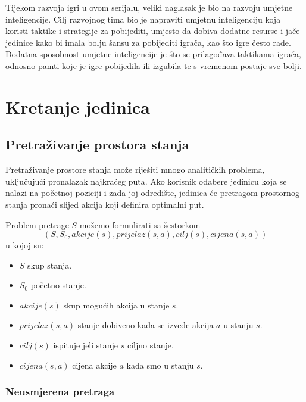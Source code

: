 \documentclass[times, utf8, zavrsni, numeric]{fer}
\begin{document}
\par Tijekom razvoja igri u ovom serijalu, veliki naglasak je bio na razvoju umjetne inteligencije.
Cilj razvojnog tima bio je napraviti umjetnu inteligenciju koja koristi taktike i strategije za pobijediti, umjesto da dobiva dodatne resurse i jače jedinice kako bi imala bolju šansu za pobijediti igrača, kao što igre često rade.
Dodatna sposobnost umjetne inteligencije je što se prilagođava taktikama igrača, odnosno pamti koje je igre pobijedila ili izgubila te s vremenom postaje sve bolji.

\chapter{Kretanje jedinica}\label{ch:pathfinding}

\section{Pretraživanje prostora stanja}\label{sec:stateSearch}

\par Pretraživanje prostore stanja može riješiti mnogo analitičkih problema, uključujući pronalazak najkraćeg puta. 
Ako korisnik odabere jedinicu koja se nalazi na početnoj poziciji i zada joj odredište, jedinica će pretragom prostornog stanja pronaći slijed akcija koji definira optimalni put.

\par Problem pretrage \(S\) možemo formulirati sa šestorkom
\[(S, S_0, akcije(s), prijelaz(s, a), cilj(s), cijena(s, a))\]
u kojoj su:
\begin{itemize}
    \item \(S\) skup stanja.
    \item \(S_0\) početno stanje.
    \item \(akcije(s)\) skup mogućih akcija u stanje \(s\).
    \item \(prijelaz(s, a)\) stanje dobiveno kada se izvede akcija \(a\) u stanju \(s\).
    \item \(cilj(s)\) ispituje jeli stanje \(s\) ciljno stanje.
    \item \(cijena(s, a)\) cijena akcije \(a\) kada smo u stanju \(s\). 
\end{itemize}

\subsection{Neusmjerena pretraga}
\end{document}
